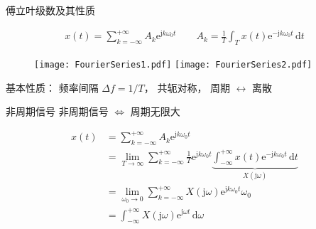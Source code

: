 \documentclass[UTF8]{ctexbeamer}
\begin{document}
\begin{frame}{傅立叶级数及其性质}
    \begin{tcolorbox}[top=0mm,
        title = 傅立叶级数（Fourier Series）,
        boxrule = 0.3pt,
        fontupper = \normalcolor\small]
        \begin{gather*}
            x(t) = \sum_{k=-\infty}^{+\infty} A_k \mathrm{e}^{\mathrm{j}k\omega_0t}  
            \qquad
            A_k = \frac{1}{T} \int_T x(t) \mathrm{e}^{-\mathrm{j}k\omega_0t}\,\mathrm{d}t
        \end{gather*}
    \end{tcolorbox}
    
    \begin{figure}
        \centering
        \texttt{[image: FourierSeries1.pdf]}
        \hspace{20pt}
        \texttt{[image: FourierSeries2.pdf]}
    \end{figure}

    基本性质：
    频率间隔 $\Delta f = 1/T$，
    共轭对称， 
    周期 $\leftrightarrow$ 离散
\end{frame}


\begin{frame}{非周期信号}
    非周期信号 $\Leftrightarrow$ 周期无限大

    \begin{equation*}
        \begin{aligned}
            x(t) &= \sum_{k=-\infty}^{+\infty} A_k \mathrm{e}^{\mathrm{j}k\omega_0t}  \\
            &= \lim_{T \to \infty} \sum_{k=-\infty}^{+\infty} \frac{1}{T}\mathrm{e}^{\mathrm{j}k\omega_0t} 
            \underbrace{\int_{-\infty}^{+\infty} x(t) \mathrm{e}^{-\mathrm{j}k\omega_0t}\,\mathrm{d} t }_{X(\mathrm{j}\omega)} \\
            &= \lim_{\omega_0 \to 0} \sum_{k  = -\infty}^{+\infty} X(\mathrm{j}\omega) \mathrm{e}^{\mathrm{j}k\omega_0t} \omega_0  \\
            &= \int_{-\infty}^{+\infty} X(\mathrm{j}\omega)  \mathrm{e}^{\mathrm{j}\omega t}\, \mathrm{d}\omega
        \end{aligned}
    \end{equation*}
\end{frame}
\end{document}

